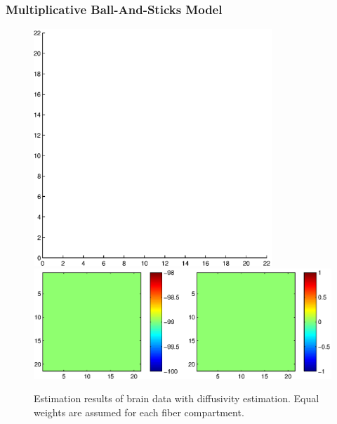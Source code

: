 \documentclass{article}
\begin{document}
\subsubsection{Multiplicative Ball-And-Sticks Model}

\begin{figure}[H]
  \caption{Estimation results of brain data with diffusivity estimation. Equal weights are assumed for each fiber compartment.}
  \centering
  \includegraphics[width=0.8\textwidth]{figures/brain_modbas_diffus_dir.eps}
  \includegraphics[width=\textwidth]{figures/brain_modbas_diffus_like.eps}
\end{figure}
\end{document}
